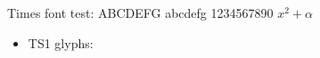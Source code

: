 \documentclass[12pt]{report}
\begin{document}
Times font test: ABCDEFG abcdefg 1234567890 $x^2+\alpha$
\begin{itemize}[leftmargin=*]
  \item TS1 glyphs: \textbullet\ \textdegree\ \texteuro
\end{itemize}
\end{document}
